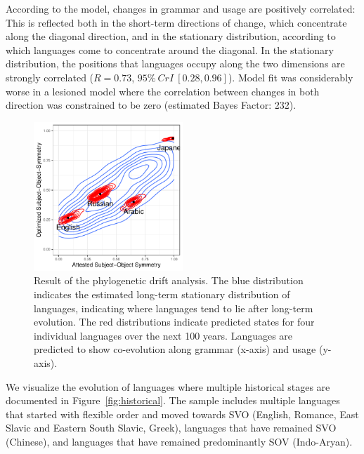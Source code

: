 \documentclass[11pt,a4paper]{article}
\begin{document}
According to the model, changes in grammar and usage are positively correlated:
This is reflected both in the short-term directions of change, which concentrate along the diagonal direction, and in the stationary distribution, according to which languages come to concentrate around the diagonal.
In the stationary distribution, the positions that languages occupy along the two dimensions are strongly correlated ($R=0.73$, $95\%\ CrI\ [0.28, 0.96]$).
Model fit was considerably worse in a lesioned model where the correlation between changes in both direction was constrained to be zero (estimated Bayes Factor: 232).


\begin{figure}
    \centering
    \includegraphics[width=0.5\textwidth]{../change/visualize/stationary.pdf}
    \caption{Result of the phylogenetic drift analysis.
    The blue distribution indicates the estimated long-term stationary distribution of languages, indicating where languages tend to lie after long-term evolution.
    The red distributions indicate predicted states for four individual languages over the next 100 years. Languages are predicted to show co-evolution along grammar (x-axis)  and usage (y-axis).}
    \label{fig:drift-model}
\end{figure}



We visualize the evolution of languages where multiple historical stages are documented in Figure~\ref{fig:historical}.
The sample includes multiple languages that started with flexible order and moved towards SVO (English, Romance, East Slavic and Eastern South Slavic, Greek), languages that have remained SVO (Chinese), and languages that have remained predominantly SOV (Indo-Aryan).
\end{document}
